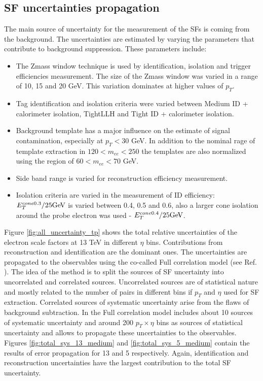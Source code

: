     
    \subsection{SF uncertainties propagation}
    The main source of uncertainty for the measurement of the SFs is coming from the background. The uncertainties are estimated by varying the parameters that contribute to background suppression. These parameters include:
    \begin{itemize}
    	\item The Zmass window technique is used by identification, isolation and trigger efficiencies measurement. The size of the Zmass window was varied in a range of 10, 15 and 20 GeV. This variation dominates at higher values of $p_T$.
    	\item Tag identification and isolation criteria were varied between Medium ID + calorimeter isolation, TightLLH and Tight ID + calorimeter isolation.
    	\item Background template has a major influence on the estimate of signal contamination, especially at $p_T<30$ GeV. In addition to the nominal rage of template extraction in $120 < m_{ee} < 250$ the templates are also normalized using the region of $60 < m_{ee} < 70$ GeV.
    	\item Side band range is varied for reconstruction efficiency measurement. 
    	\item Isolation criteria are varied in the measurement of ID efficiency: $E_T^{cone0.3}/25\text{Ge\kern -0.1em V}$ is varied between 0.4, 0.5 and 0.6, also a larger cone isolation around the probe electron was used - $E_T^{cone0.4}/25\text{Ge\kern -0.1em V}$.
    \end{itemize}
    
    Figure \ref{fig:all_uncertainty_tp} shows the total relative uncertainties of the electron scale factors at 13 TeV in different $\eta$ bins. Contributions from reconstruction and identification are the dominant ones. The uncertainties are propagated to the observables using the co-called Full correlation model (see Ref. \cite{topoclust_2019}). The idea of the method is to split the sources of SF uncertainty into uncorrelated and correlated sources. Uncorrelated sources are of statistical nature and mostly related to the number of \Zee pairs in different bins if $p_T$ and $\eta$ used for SF extraction. Correlated sources of systematic uncertainty arise from the flaws of background subtraction. In the Full correlation model includes about 10 sources of systematic uncertainty and around 200 $p_T\times\eta$ bins as sources of statistical uncertainty and allows to propagate these uncertainties to the observables. Figures \ref{fig:total_sys_13_medium} and \ref{fig:total_sys_5_medium} contain the results of error propagation for 13 and 5 \tev{} respectively. Again, identification and reconstruction uncertainties have the largest contribution to the total SF uncertainty. 
    
